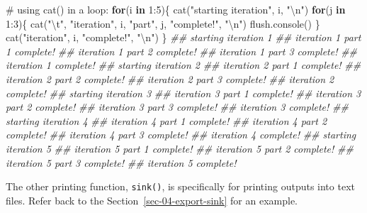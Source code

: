 \documentclass[
  13,
  letterpaper,
]{report}
\newenvironment{Shaded}{\begin{snugshade}}{\end{snugshade}}
\newcommand{\CommentTok}[1]{\textcolor[rgb]{0.37,0.37,0.37}{#1}}
\newcommand{\ControlFlowTok}[1]{\textcolor[rgb]{0.00,0.23,0.31}{\textbf{#1}}}
\newcommand{\DecValTok}[1]{\textcolor[rgb]{0.68,0.00,0.00}{#1}}
\newcommand{\DocumentationTok}[1]{\textcolor[rgb]{0.37,0.37,0.37}{\textit{#1}}}
\newcommand{\FunctionTok}[1]{\textcolor[rgb]{0.28,0.35,0.67}{#1}}
\newcommand{\NormalTok}[1]{\textcolor[rgb]{0.00,0.23,0.31}{#1}}
\newcommand{\SpecialCharTok}[1]{\textcolor[rgb]{0.37,0.37,0.37}{#1}}
\newcommand{\StringTok}[1]{\textcolor[rgb]{0.13,0.47,0.30}{#1}}
\begin{document}
\begin{Shaded}
\begin{Highlighting}[]
\CommentTok{\# using cat() in a loop:}
\ControlFlowTok{for}\NormalTok{(i }\ControlFlowTok{in} \DecValTok{1}\SpecialCharTok{:}\DecValTok{5}\NormalTok{)\{}
    \FunctionTok{cat}\NormalTok{(}\StringTok{"starting iteration"}\NormalTok{, i, }\StringTok{"}\SpecialCharTok{\textbackslash{}n}\StringTok{"}\NormalTok{)}
    \ControlFlowTok{for}\NormalTok{(j }\ControlFlowTok{in} \DecValTok{1}\SpecialCharTok{:}\DecValTok{3}\NormalTok{)\{}
        \FunctionTok{cat}\NormalTok{(}\StringTok{"}\SpecialCharTok{\textbackslash{}t}\StringTok{"}\NormalTok{, }\StringTok{"iteration"}\NormalTok{, i, }\StringTok{"part"}\NormalTok{, j, }\StringTok{"complete!"}\NormalTok{, }\StringTok{"}\SpecialCharTok{\textbackslash{}n}\StringTok{"}\NormalTok{)}
        \FunctionTok{flush.console}\NormalTok{()}
\NormalTok{    \}}
    \FunctionTok{cat}\NormalTok{(}\StringTok{"iteration"}\NormalTok{, i, }\StringTok{"complete!"}\NormalTok{, }\StringTok{"}\SpecialCharTok{\textbackslash{}n}\StringTok{"}\NormalTok{)}
\NormalTok{\}}
\DocumentationTok{\#\# starting iteration 1 }
\DocumentationTok{\#\#   iteration 1 part 1 complete! }
\DocumentationTok{\#\#   iteration 1 part 2 complete! }
\DocumentationTok{\#\#   iteration 1 part 3 complete! }
\DocumentationTok{\#\# iteration 1 complete! }
\DocumentationTok{\#\# starting iteration 2 }
\DocumentationTok{\#\#   iteration 2 part 1 complete! }
\DocumentationTok{\#\#   iteration 2 part 2 complete! }
\DocumentationTok{\#\#   iteration 2 part 3 complete! }
\DocumentationTok{\#\# iteration 2 complete! }
\DocumentationTok{\#\# starting iteration 3 }
\DocumentationTok{\#\#   iteration 3 part 1 complete! }
\DocumentationTok{\#\#   iteration 3 part 2 complete! }
\DocumentationTok{\#\#   iteration 3 part 3 complete! }
\DocumentationTok{\#\# iteration 3 complete! }
\DocumentationTok{\#\# starting iteration 4 }
\DocumentationTok{\#\#   iteration 4 part 1 complete! }
\DocumentationTok{\#\#   iteration 4 part 2 complete! }
\DocumentationTok{\#\#   iteration 4 part 3 complete! }
\DocumentationTok{\#\# iteration 4 complete! }
\DocumentationTok{\#\# starting iteration 5 }
\DocumentationTok{\#\#   iteration 5 part 1 complete! }
\DocumentationTok{\#\#   iteration 5 part 2 complete! }
\DocumentationTok{\#\#   iteration 5 part 3 complete! }
\DocumentationTok{\#\# iteration 5 complete!}
\end{Highlighting}
\end{Shaded}

The other printing function, \texttt{sink()}, is specifically for
printing outputs into text files. Refer back to the
Section~\ref{sec-04-export-sink} for an example.
\end{document}

